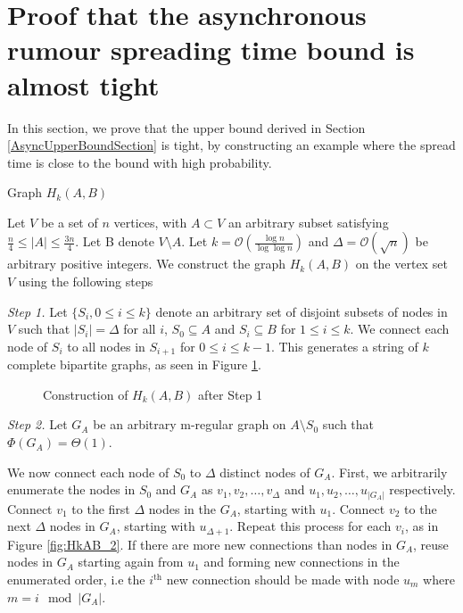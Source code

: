 \section{Proof that the asynchronous rumour spreading time bound is almost tight}
\label{section:AsyncLowerBound}

In this section, we prove that the upper bound derived in Section \ref{AsyncUpperBoundSection} is tight, by constructing an example where the spread time is close to the bound with high probability.

\begin{definition}\label{def:HkAB}
 	Graph $H_k(A,B)$

	Let $V$ be a set of $n$ vertices, with $A \subset V$ an arbitrary subset satisfying $\frac{n}{4} \leq |A| \leq \frac{3n}{4}$. Let B denote $V \setminus A$. Let $k = \mathcal{O}\left(\frac{\log n}{\log \log n}\right)$ and $\Delta = \mathcal{O}(\sqrt{n})$ be arbitrary positive integers. We construct the graph $H_k(A,B)$ on the vertex set $V$ using the following steps


	\textit{Step 1.} Let $\{S_i, 0 \leq i \leq k\}$ denote an arbitrary set of disjoint subsets of nodes in $V$ such that $|S_i| = \Delta$ for all $i$, $S_0 \subseteq A$ and $S_i \subseteq B$ for $1 \leq i \leq k$. We connect each node of $S_i$ to all nodes in $S_{i+1}$ for $0 \leq i \leq k - 1$. This generates a string of $k$ complete bipartite graphs, as seen in Figure \ref{fig:HkAB_1}.


    \begin{figure}[h]
        \centering
        
        \caption{Construction of $H_k(A,B)$ after Step 1}
        \label{fig:HkAB_1}
    \end{figure}
    
	\textit{Step 2.} Let $G_A$ be an arbitrary m-regular %
	graph on $A \setminus S_0$ such that $\Phi(G_A) = \Theta(1)$. %


	We now connect each node of $S_0$ to $\Delta$ distinct nodes of $G_A$. First, we arbitrarily enumerate the nodes in $S_0$ and $G_A$ as $v_1, v_2, \dots, v_\Delta$ and $u_1, u_2, \dots, u_{|G_A|}$ respectively. Connect $v_1$ to the first $\Delta$ nodes in the $G_A$, starting with $u_1$. Connect $v_2$ to the next $\Delta$ nodes in $G_A$, starting with $u_{\Delta + 1}$.
	Repeat this process for each $v_i$, as in Figure \ref{fig:HkAB_2}.
	If there are more new connections than nodes in $G_A$, reuse nodes in $G_A$ starting again from $u_1$ and forming new connections in the enumerated order, i.e the $i^\text{th}$ new connection should be made with node $u_m$ where $m = i\mod |G_A|$.


\end{definition}
